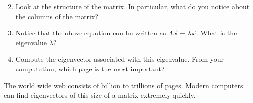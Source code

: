 \begin{problem}
\begin{enumerate}
$$$$
\item Look at the structure of the matrix.  In particular, what do you notice about the columns of the matrix?
\item Notice that the above equation can be written as $A\vec x = \lambda \vec x$. What is the eigenvalue $\lambda$?
\item Compute the eigenvector associated with this eigenvalue.  From your computation, which page is the most important?
\end{enumerate}
The world wide web consists of billion to trillions of pages. Modern computers can find eigenvectors of this size of a matrix extremely quickly.  
\end{problem}
















